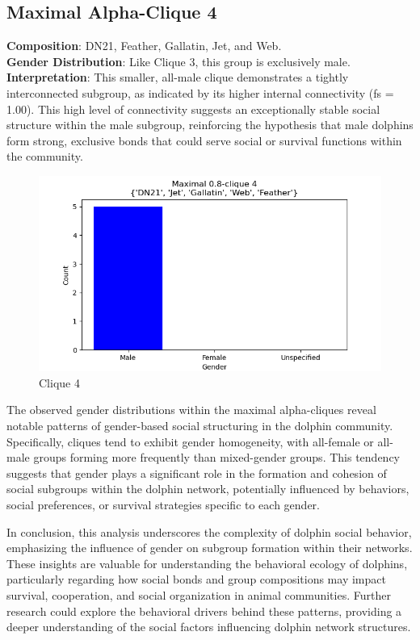 \subsection{Maximal Alpha-Clique 4}
\textbf{Composition}: DN21, Feather, Gallatin, Jet, and Web. \\
\textbf{Gender Distribution}: Like Clique 3, this group is exclusively male. \\
\textbf{Interpretation}: This smaller, all-male clique demonstrates a tightly interconnected subgroup, as indicated by its higher internal connectivity (fs = 1.00). This high level of connectivity suggests an exceptionally stable social structure within the male subgroup, reinforcing the hypothesis that male dolphins form strong, exclusive bonds that could serve social or survival functions within the community.
\begin{figure}[H]
    \centering
    \includegraphics[width=1.0\textwidth]{imgs/clique_4.png}
    \caption{Clique 4}
    \label{fig:clique_4}
\end{figure}

The observed gender distributions within the maximal alpha-cliques reveal notable patterns of gender-based social structuring in the dolphin community. Specifically, cliques tend to exhibit gender homogeneity, with all-female or all-male groups forming more frequently than mixed-gender groups. This tendency suggests that gender plays a significant role in the formation and cohesion of social subgroups within the dolphin network, potentially influenced by behaviors, social preferences, or survival strategies specific to each gender.

In conclusion, this analysis underscores the complexity of dolphin social behavior, emphasizing the influence of gender on subgroup formation within their networks. These insights are valuable for understanding the behavioral ecology of dolphins, particularly regarding how social bonds and group compositions may impact survival, cooperation, and social organization in animal communities. Further research could explore the behavioral drivers behind these patterns, providing a deeper understanding of the social factors influencing dolphin network structures.
